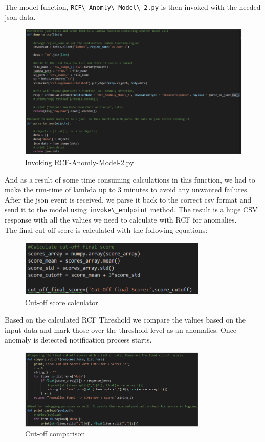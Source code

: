 The model function, \verb|RCF\_Anomly\_Model\_2.py| is then invoked with the needed json data. 
\begin{figure}[h]

    \centering
    \includegraphics[width=1\textwidth]{images/json-generator.png}
    \caption{Invoking RCF-Anomly-Model-2.py}
    \label{fig:json_generator}
\end{figure}
And as a result of some time consuming calculations in this function, we had to make the run-time of lambda up to 3 minutes to avoid any unwanted failures.\\
After the json event is received, we parse it back to the correct csv format and send it to the model using \verb|invoke\_endpoint| method. The result is a huge CSV response with all the values we need to calculate with RCF for anomalies.\\
The final cut-off score is calculated with the following equations:
\begin{figure}[h!]
    \centering
    \includegraphics[width=0.8\textwidth]{images/cutt-off-calculator.png}
    \caption{Cut-off score calculator}
    \label{fig:cut_off_calculator}
\end{figure}
Based on the calculated RCF Threshold we compare the values based on the input data and mark those over the threshold level as an anomalies. Once anomaly is detected notification process starts.\\
\begin{figure}[h!]
    \centering
    \includegraphics[width=0.8\textwidth]{images/cutt-off-comparison.png}
    \caption{Cut-off comparison}
    \label{fig:cut_off_comparison}
\end{figure}
